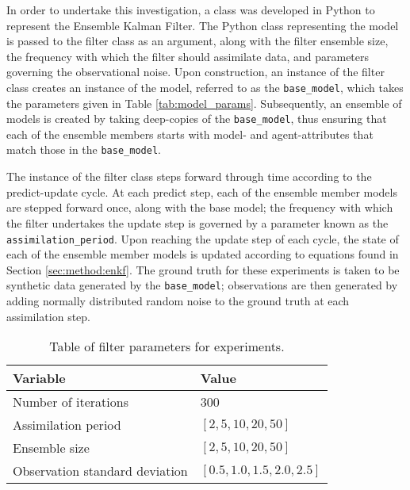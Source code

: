 In order to undertake this investigation, a class was developed in Python to
represent the Ensemble Kalman Filter.
The Python class representing the model is passed to the filter class as an
argument, along with the filter ensemble size, the frequency with which the
filter should assimilate data, and parameters governing the observational noise.
Upon construction, an instance of the filter class creates an instance of the
model, referred to as the \texttt{base\_model}, which takes the parameters given
in Table \ref{tab:model_params}.
Subsequently, an ensemble of models is created by taking deep-copies of the
\texttt{base\_model}, thus ensuring that each of the ensemble members starts
with model- and agent-attributes that match those in the \texttt{base\_model}.

The instance of the filter class steps forward through time according to the
predict-update cycle.
At each predict step, each of the ensemble member models are stepped forward
once, along with the base model; the frequency with which the filter undertakes
the update step is governed by a parameter known as the
\texttt{assimilation\_period}.
Upon reaching the update step of each cycle, the state of each of the ensemble
member models is updated according to equations found in Section
\ref{sec:method:enkf}.
The ground truth for these experiments is taken to be synthetic data generated
by the \texttt{base\_model}; observations are then generated by adding normally
distributed random noise to the ground truth at each assimilation step.

\begin{table}[h]
    \centering
    \begin{tabular}{@{}ll@{}}
        \toprule
        Variable                       & Value                         \\ \midrule
        Number of iterations           & 300                           \\
        Assimilation period            & $[2, 5, 10, 20, 50]$          \\
        Ensemble size                  & $[2, 5, 10, 20, 50]$          \\
        Observation standard deviation & $[0.5, 1.0, 1.5, 2.0, 2.5]$   \\ \bottomrule
    \end{tabular}
    \caption{Table of filter parameters for experiments.}\label{tab:filter_params}
    \label{tab:filter_params}
\end{table}

